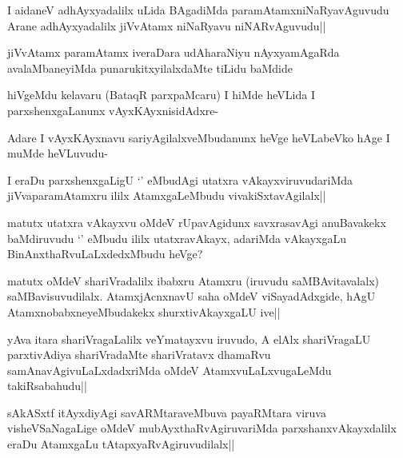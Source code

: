 
\begin{artha}
I aidaneV adhAyxyadalilx uLida BAgadiMda paramAtamxniNaRyavAguvudu Arane adhAyxyadalilx jiVvAtamx niNaRyavu niNARvAguvudu||
\end{artha}

\begin{artha}
jiVvAtamx paramAtamx iveraDara udAharaNiyu nAyxyamAgaRda avalaMbaneyiMda punarukitxyilalxdaMte tiLidu baMdide
\end{artha}


\begin{artha}
hiVgeMdu kelavaru (BataqR parxpaMcaru) I hiMde heVLida I parxshenxgaLanunx vAyxKAyxnisidAdxre-

Adare I vAyxKAyxnavu sariyAgilalxveMbudanunx heVge heVLabeVko hAge I muMde heVLuvudu-
\end{artha}

\begin{artha}
I eraDu parxshenxgaLigU `\stext ' eMbudAgi utatxra vAkayxviruvudariMda jiVvaparamAtamxru ililx AtamxgaLeMbudu vivakiSxtavAgilalx|| 

matutx utatxra vAkayxvu oMdeV rUpavAgidunx savxrasavAgi anuBavakekx baMdiruvudu `\stext ' eMbudu ililx utatxravAkayx, adariMda vAkayxgaLu BinAnxthaRvuLaLxdedxMbudu heVge?
\end{artha}%

\begin{artha}
matutx oMdeV shariVradalilx ibabxru Atamxru (iruvudu saMBAvitavalalx) saMBavisuvudilalx. AtamxjAcnxnavU saha oMdeV viSayadAdxgide, hAgU AtamxnobabxneyeMbudakekx shurxtivAkayxgaLU ive||
\end{artha}

\begin{artha}
yAva itara shariVragaLalilx veYmatayxvu iruvudo, A elAlx shariVragaLU parxtivAdiya shariVradaMte shariVratavx dhamaRvu samAnavAgivuLaLxdadxriMda oMdeV AtamxvuLaLxvugaLeMdu takiRsabahudu||
\end{artha}

\begin{artha}
sAkASxtf itAyxdiyAgi savARMtaraveMbuva payaRMtara viruva visheVSaNagaLige oMdeV mubAyxthaRvAgiruvariMda parxshanxvAkayxdalilx eraDu AtamxgaLu tAtapxyaRvAgiruvudilalx||
\end{artha}

